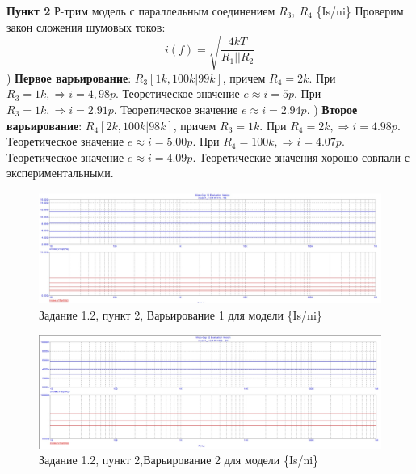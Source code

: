 \documentclass[a4paper, 14pt]{extarticle}%
\begin{document}
\newline

\textbf{Пункт 2}
Р-трим модель с параллельным соединением $R_3, \: R_4$ \{Is/ni\}
\newline
Проверим закон сложения шумовых токов:
\[ i(f) = \sqrt{\frac{4kT}{R_1 || R_2}}  \]
) \textbf{Первое варьирование}: $R_3[1k, 100k | 99k]$, причем $R_4 = 2k$.
\newline
При $R_3 = 1k, \Rightarrow  i = 4,98p$.
Теоретическое значение $e \approx i = 5p$.
\newline
При $R_3 = 1k, \Rightarrow  i = 2.91p$.
Теоретическое значение $e \approx i = 2.94p$.
) \textbf{Второе варьирование}: $R_4[2k, 100k | 98k]$, причем $R_3 = 1k$.
\newline
При $R_4 = 2k, \Rightarrow  i = 4.98p$.
Теоретическое значение $e \approx i = 5.00p$.
\newline
При $R_4 = 100k, \Rightarrow  i = 4.07p$.
Теоретическое значение $e \approx i = 4.09p$.
\newline
Теоретические значения хорошо совпали с экспериментальными.

\newline
\begin{figure}[h!]
			\centering
			\includegraphics[width=1.1\linewidth]{1.2/pic6.jpg}
			\caption{Задание 1.2, пункт 2, Варьирование 1 для модели \{Is/ni\}}
			\label{A}
\end{figure}
\newline
\begin{figure}[h!]
			\centering
			\includegraphics[width=1.1\linewidth]{1.2/pic7.jpg}
			\caption{Задание 1.2, пункт 2,Варьирование 2 для модели \{Is/ni\}}
			\label{A}
\end{figure}
\newline
\end{document}
